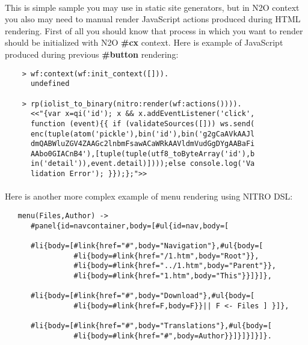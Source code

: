 \paragraph{}
This is simple sample you may use in static site generators, but in N2O context
you also may need to manual render JavaScript actions produced during HTML rendering.
First of all you should know that process in which you want to render should be
initialized with N2O {\bf \#cx} context. Here is example of JavaScript
produced during previous {\bf \#button} rendering:

\vspace{1\baselineskip}
\begin{lstlisting}
    > wf:context(wf:init_context([])).
      undefined

    > rp(iolist_to_binary(nitro:render(wf:actions()))).
      <<"{var x=qi('id'); x && x.addEventListener('click',
      function (event){{ if (validateSources([])) ws.send(
      enc(tuple(atom('pickle'),bin('id'),bin('g2gCaAVkAAJl
      dmQABWluZGV4ZAAGc2lnbmFsawACaWRkAAVldmVudGgDYgAABaFi
      AAbo0GIACnB4'),[tuple(tuple(utf8_toByteArray('id'),b
      in('detail')),event.detail)])));else console.log('Va
      lidation Error'); }});};">>
\end{lstlisting}
\vspace{1\baselineskip}

\newpage
\paragraph{}
Here is another more complex example of menu rendering using NITRO DSL:

\vspace{1\baselineskip}
\begin{lstlisting}
   menu(Files,Author) ->
      #panel{id=navcontainer,body=[#ul{id=nav,body=[

      #li{body=[#link{href="#",body="Navigation"},#ul{body=[
                #li{body=#link{href="/1.htm",body="Root"}},
                #li{body=#link{href="../1.htm",body="Parent"}},
                #li{body=#link{href="1.htm",body="This"}}]}]},

      #li{body=[#link{href="#",body="Download"},#ul{body=[
                #li{body=#link{href=F,body=F}}|| F <- Files ] }]},

      #li{body=[#link{href="#",body="Translations"},#ul{body=[
                #li{body=#link{href="#",body=Author}}]}]}]}]}.
\end{lstlisting}
\vspace{1\baselineskip}

